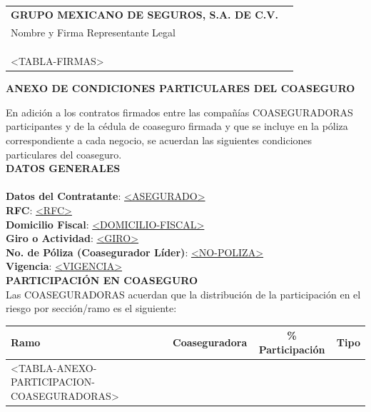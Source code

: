 \documentclass[letterpaper,10pt]{article}
\begin{document}
\begin{center}
    \begin{tabularx}{\textwidth}{Xr}
        \textbf{GRUPO MEXICANO DE SEGUROS, S.A. DE C.V.} &\\
        Nombre y Firma Representante Legal & \underline{\hspace{5cm}}\\\\\\\\
        <TABLA-FIRMAS>
    \end{tabularx}
\end{center}
\newpage

\begin{center}
    \textbf{ANEXO DE CONDICIONES PARTICULARES DEL COASEGURO}
\end{center}

En adición a los contratos firmados entre las compañías COASEGURADORAS participantes y de la cédula de coaseguro firmada y que se incluye en la póliza correspondiente a cada negocio, se acuerdan las siguientes condiciones particulares del coaseguro.\\


\textbf{DATOS GENERALES}\\\\
\textbf{Datos del Contratante}: \underline{<ASEGURADO>}\\
\textbf{RFC}: \underline{<RFC>}\\
\textbf{Domicilio Fiscal}: \ul{<DOMICILIO-FISCAL>}\\
\textbf{Giro o Actividad}: \ul{<GIRO>}\\
\textbf{No. de Póliza (Coasegurador Líder)}: \underline{<NO-POLIZA>}\\
\textbf{Vigencia}: \underline{<VIGENCIA>}\\

\textbf{PARTICIPACIÓN EN COASEGURO}\\

Las COASEGURADORAS acuerdan que la distribución de la participación en el riesgo por sección/ramo es el siguiente:

\begin{center}
    \begin{tabularx}{\textwidth}{|X|c|c|c|}
        \hline
        \textbf{Ramo} & \textbf{Coaseguradora} & \textbf{\% Participación} & \textbf{Tipo}\\\hline
        <TABLA-ANEXO-PARTICIPACION-COASEGURADORAS>
    \end{tabularx}
\end{center}
\end{document}
